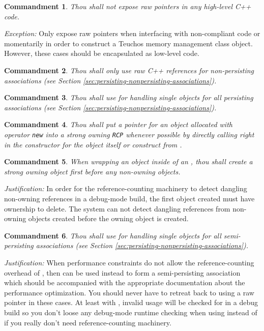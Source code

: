 \documentclass[pdf,ps2pdf,11pt]{SANDreport}
\newtheorem{commandment}{Commandment}
\begin{document}
\begin{commandment}
Thou shall not expose raw pointers in any high-level C++ code.
\end{commandment}

{}\textit{Exception:} Only expose raw pointers when interfacing with
non-compliant code or momentarily in order to construct a Teuchos
memory management class object.  However, these cases should be
encapsulated as low-level code.

\begin{commandment}
Thou shall only use raw C++ references for non-persisting associations
(see Section {}\ref{sec:persisting-nonpersisting-associations}).
\end{commandment}

\begin{commandment}
Thou shall use {} for handling single objects for all
persisting associations (see Section
{}\ref{sec:persisting-nonpersisting-associations}).
\end{commandment}

\begin{commandment}\label{cmnd:rcp-new}
Thou shall put a pointer for an object allocated with operator
{}\texttt{new} into a strong owning {}\texttt{RCP} whenever possible
by directly calling {} right in the constructor for the
{} object itself or construct from {}.
\end{commandment}

\begin{commandment}\label{cmnd:owning-rcp-first}
When wrapping an object inside of an {}, thou shall create
a strong owning {} object first before any non-owning
{} objects.
\end{commandment}
{}\textit{Justification:} In order for the reference-counting
machinery to detect dangling non-owning references in a debug-mode
build, the first {} object created must have ownership to
delete.  The system can not detect dangling references from non-owning
{} objects created before the owning
{} object is created.

\begin{commandment}\label{cmnd:ptr-semi-persisting}
Thou shall use {} for handling single objects for all
semi-persisting associations (see Section
{}\ref{sec:persisting-nonpersisting-associations}).
\end{commandment}
{}\textit{Justification:} When performance constraints do not allow
the reference-counting overhead of {}, then {}
can be used instead to form a semi-persisting association which should
be accompanied with the appropriate documentation about the
performance optimization.  You should never have to retreat back to
using a raw pointer in these cases.  At least with {},
invalid usage will be checked for in a debug build so you don't loose
any debug-mode runtime checking when using {} instead of
{} if you really don't need reference-counting machinery.
\end{document}
